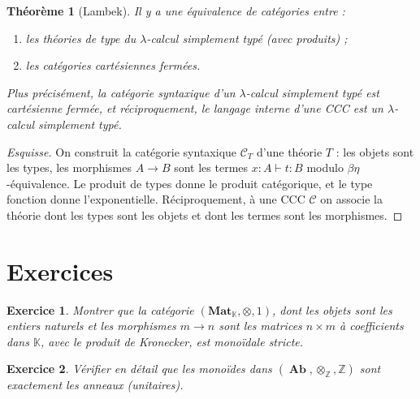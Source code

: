 \documentclass[a4paper,12pt]{book}
\DeclareMathOperator{\Ab}{\mathbf{Ab}}
\newcommand{\Z}{\mathbb{Z}}
\newcommand{\K}{\mathbb{K}}
\newtheorem{theoreme}{Théorème}[chapter]
\newtheorem{exercice}{Exercice}[chapter]
\begin{document}
\begin{theoreme}[Lambek]\label{thm:lambek}
Il y a une équivalence de catégories entre :
\begin{enumerate}[label=(\alph*)]
\item les théories de type du $\lambda$-calcul simplement typé
      (avec produits) ;
\item les catégories cartésiennes fermées.
\end{enumerate}
Plus précisément, la catégorie syntaxique d'un $\lambda$-calcul
simplement typé est cartésienne fermée, et réciproquement,
le langage interne d'une CCC est un $\lambda$-calcul simplement typé.
\end{theoreme}

\begin{proof}[Esquisse]
On construit la catégorie syntaxique $\mathcal{C}_T$ d'une théorie $T$ :
les objets sont les types, les morphismes $A \to B$ sont les termes
$x : A \vdash t : B$ modulo $\beta\eta$-équivalence.
Le produit de types donne le produit catégorique,
et le type fonction donne l'exponentielle.
Réciproquement, à une CCC $\mathcal{C}$ on associe la théorie
dont les types sont les objets et dont les termes sont les morphismes.
\end{proof}


\section{Exercices}\label{sec:exo-monoidales}

\begin{exercice}\label{exo:monoidale-strict}
Montrer que la catégorie $(\mathbf{Mat}_\K, \otimes, 1)$, dont les
objets sont les entiers naturels et les morphismes $m \to n$ sont
les matrices $n \times m$ à coefficients dans $\K$, avec le produit
de Kronecker, est monoïdale stricte.
\end{exercice}

\begin{exercice}\label{exo:monoide-dans-Ab}
Vérifier en détail que les monoïdes dans $(\Ab, \otimes_\Z, \Z)$
sont exactement les anneaux (unitaires).
\end{exercice}
\end{document}
